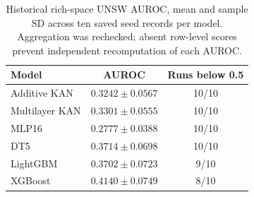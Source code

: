 \begin{table}[t]
\caption{Historical rich-space UNSW AUROC, mean and sample SD across ten saved seed records per model. Aggregation was rechecked; absent row-level scores prevent independent recomputation of each AUROC.}
\label{tab:unsw-auroc}
\centering\footnotesize
\begin{tabular}{lcc}
\toprule
Model & AUROC & Runs below 0.5\\
\midrule
Additive KAN & $0.3242\pm0.0567$ & 10/10\\
Multilayer KAN & $0.3301\pm0.0555$ & 10/10\\
MLP16 & $0.2777\pm0.0388$ & 10/10\\
DT5 & $0.3714\pm0.0698$ & 10/10\\
LightGBM & $0.3702\pm0.0723$ & 9/10\\
XGBoost & $0.4140\pm0.0749$ & 8/10\\
\bottomrule
\end{tabular}
\end{table}
